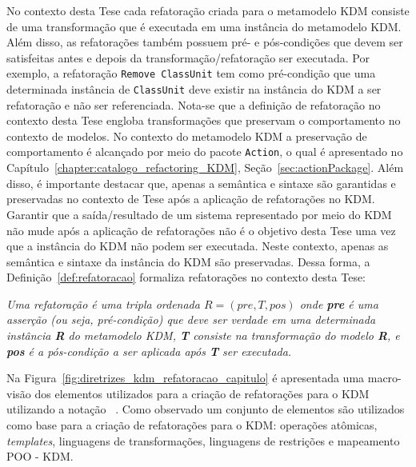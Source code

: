 No contexto desta Tese cada refatoração criada para o metamodelo KDM consiste de uma transformação que é executada em uma instância do metamodelo KDM. Além disso, as refatorações também possuem pré- e pós-condições que devem ser satisfeitas antes e depois da transformação/refatoração ser executada. Por exemplo, a refatoração \texttt{Remove ClassUnit} tem como pré-condição que uma determinada instância de \texttt{ClassUnit} deve existir na instância do KDM a ser refatoração e não ser referenciada. Nota-se que a definição de refatoração no contexto desta Tese engloba transformações que preservam o comportamento no contexto de modelos. No contexto do metamodelo KDM a preservação de comportamento é alcançado por meio do pacote \texttt{Action}, o qual é apresentado no Capítulo~\ref{chapter:catalogo_refactoring_KDM}, Seção~\ref{sec:actionPackage}. Além disso, é importante destacar que, apenas a semântica e sintaxe são garantidas e preservadas no contexto de Tese após a aplicação de refatorações no KDM. Garantir que a saída/resultado de um sistema representado por meio do KDM não mude após a aplicação de refatorações não é o objetivo desta Tese uma vez que a instância do KDM não podem ser executada. Neste contexto, apenas as semântica e sintaxe da instância do KDM são preservadas. Dessa forma, a Definição~\ref{def:refatoracao} formaliza refatorações no contexto desta Tese:


\begin{definicao}\label{def:refatoracao}
    \textit{Uma refatoração é uma tripla ordenada $R = (pre, T, pos)$ onde \textbf{pre} é uma asserção (ou seja, pré-condição) que deve ser verdade em uma determinada instância \textbf{R} do metamodelo KDM, \textbf{T} consiste na transformação do modelo \textbf{R}, e \textbf{pos} é a pós-condição a ser aplicada após \textbf{T} ser executada.}
\end{definicao}


Na Figura~\ref{fig:diretrizes_kdm_refatoracao_capitulo} é apresentada uma macro-visão dos elementos utilizados para a criação de refatorações para o KDM utilizando a notação ~\cite{Marca_1987}. Como observado um conjunto de elementos são utilizados como base para a criação de refatorações para o KDM: operações atômicas, \textit{templates}, linguagens de transformações, linguagens de restrições e mapeamento POO - KDM. 


